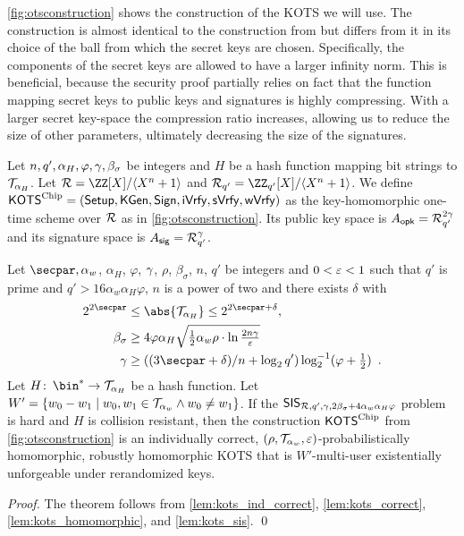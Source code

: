 \autoref{fig:otsconstruction} shows the construction of the KOTS we will use.
The construction is almost identical to the construction from \cite{CCS:FleSimZha22} but differs from it in its choice of the ball from which the secret keys are chosen.
Specifically, the components of the secret keys are allowed to have a larger infinity norm.
This is beneficial, because the security proof partially relies on fact that the function mapping secret keys to public keys and signatures is highly compressing.
With a larger secret key-space the compression ratio increases, allowing us to reduce the size of other parameters, ultimately decreasing the size of the signatures.

\begin{definition}\label{def:our_ots}
Let $n, q', \alpha_H, \varphi, \gamma, \beta_\sigma$ be integers and $H$ be a hash function mapping bit strings to $\mathcal{T}_{\alpha_H}$.
Let $\ring = \defring$ and $\ring_{q'} = \defringqq$.
% 
We define $\mathsf{KOTS}^{\textup{Chip}} = (\mathsf{Setup}, \mathsf{KGen}, \mathsf{Sign},\allowbreak \mathsf{iVrfy}, \mathsf{sVrfy}, \mathsf{wVrfy})$ as the key-homomorphic one-time scheme over $\mathcal{R}$ as in \autoref{fig:otsconstruction}.
Its public key space is $A_{\mathsf{opk}} = \mathcal{R}_{q'}^{2\gamma}$ and its signature space is $A_{\mathsf{sig}} = \mathcal{R}_{q'}^\gamma$.
\end{definition}


\begin{theorem}\label{theo:kots}
Let $\secpar, \alpha_w$, $\alpha_H$, $\varphi$, $\gamma$, $\rho$, $\beta_\sigma$, $n$, $q'$ be integers and $0 < \varepsilon < 1$ such that $q'$ is prime and $q' > 16\alpha_w\alpha_H\varphi$, $n$ is a power of two and there exists $\delta$ with
\begin{align*}
2^{2\secpar} & \leq \abs{\tern_{\alpha_H}} \leq 2^{2\secpar+\delta},\\
\beta_\sigma & \geq 4\varphi\alpha_H\sqrt{\tfrac{1}{2}\alpha_w\rho \cdot \ln\tfrac{2n\otspkkeylen}{\errorbound} }\\
\otspkkeylen & \geq((3\secpar+\delta)/n+\log_2q')\log^{-1}_2(\varphi+\tfrac{1}{2})\enspace.
\end{align*}
Let $H\colon\, \bin^* \to \tern_{\alpha_H}$ be a hash function.
Let $W' = \{w_0-w_1\mid w_0,w_1\in\mathcal{T}_{\alpha_w} \land w_0\neq w_1\}$.
If the $\mathsf{SIS}_{\mathcal{R},q',\gamma,2\beta_\sigma+4\alpha_w\alpha_H\varphi}$ problem is hard and $H$ is collision resistant,
then the construction $\mathsf{KOTS}^{\textup{Chip}}$ from \autoref{fig:otsconstruction} is an individually correct, $(\rho,\mathcal{T}_{\alpha_w},\varepsilon)$-probabilistically homomorphic, robustly homomorphic KOTS that is $W'$-multi-user existentially unforgeable under rerandomized keys.
\end{theorem}
\begin{proof}
The theorem follows from \autoref{lem:kots_ind_correct}, \autoref{lem:kots_correct}, \autoref{lem:kots_homomorphic}, and \autoref{lem:kots_sis}.
\qed
\end{proof}

